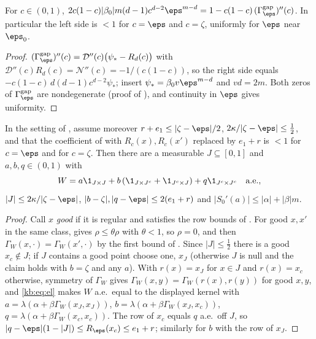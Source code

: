 \begin{lemma}\label{kb:lem:kappa}
For $c\in(0,1)$,
$2c(1-c)|\beta_0|m(d-1)c^{d-2}\eps^{m-d}=1-c(1-c)\,(\Gamma^{\mathrm{gap}}_\eps)''(c)$.
In particular the left side is $<1$ for $c=\eps$ and $c=\zeta$, uniformly for $\eps$ near
$\eps_0$.
\end{lemma}

\begin{proof}
$(\Gamma^{\mathrm{gap}}_\eps)''(c)=\mathcal D''(c)\bigl(\psi_*-R_d(c)\bigr)$ with
$\mathcal D''(c)R_d(c)=\mathcal N''(c)=-1/(c(1-c))$, so the right side equals
$-c(1-c)\,d(d-1)c^{d-2}\psi_*$; insert $\psi_*=\beta_0v\eps^{m-d}$ and $vd=2m$.  Both zeros of
$\Gamma^{\mathrm{gap}}_\eps$ are nondegenerate (proof of ), and continuity in
$\eps$ gives uniformity.
\end{proof}

\begin{proposition}[Bipodality]\label{kb:prop:bipodal}
In the setting of , assume moreover $r+e_1\le|\zeta-\eps|/2$,
$2\kappa/|\zeta-\eps|\le\frac12$, and that the coefficient of 
with $R_c(x),R_c(x')$ replaced by $e_1+r$ is $<1$ for $c=\eps$ and for $c=\zeta$.  Then there are
a measurable $J\subseteq[0,1]$ and $a,b,q\in(0,1)$ with
\[
  W=a\1_{J\times J}+b\,(\1_{J\times J^c}+\1_{J^c\times J})+q\1_{J^c\times J^c}\quad\text{a.e.},
\]
$|J|\le2\kappa/|\zeta-\eps|$, $|b-\zeta|,|q-\eps|\le2(e_1+r)$ and
$|S_0'(a)|\le|\alpha|+|\beta|m$.
\end{proposition}

\begin{proof}
Call $x$ \emph{good} if it is regular and satisfies the row bounds of
.  For good $x,x'$ in the same class,  gives
$\rho\le\theta\rho$ with $\theta<1$, so $\rho=0$, and then $\Gamma_W(x,\cdot)=\Gamma_W(x',\cdot)$
by the first bound of .  Since $|J|\le\frac12$ there is a good
$x_c\notin J$; if $J$ contains a good point choose one, $x_J$ (otherwise $J$ is null and the
claim holds with $b=\zeta$ and any $a$).  With $r(x)=x_J$ for $x\in J$ and $r(x)=x_c$ otherwise,
symmetry of $\Gamma_W$ gives $\Gamma_W(x,y)=\Gamma_W(r(x),r(y))$ for good $x,y$, and
\eqref{kb:eq:el} makes $W$ a.e.\ equal to the displayed kernel with
$a=\lambda(\alpha+\beta\Gamma_W(x_J,x_J))$, $b=\lambda(\alpha+\beta\Gamma_W(x_J,x_c))$,
$q=\lambda(\alpha+\beta\Gamma_W(x_c,x_c))$.  The row of $x_c$ equals $q$ a.e.\ off $J$, so
$|q-\eps|(1-|J|)\le R_\eps(x_c)\le e_1+r$; similarly for $b$ with the row of $x_J$.
\end{proof}

